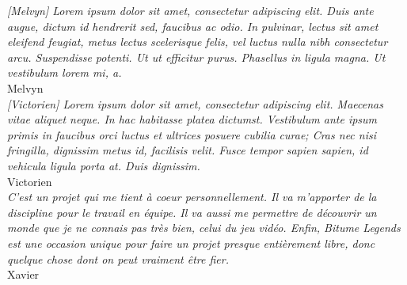 \documentclass[11pt,a4paper]{article}
\begin{document}
  \textit{[Melvyn] Lorem ipsum dolor sit amet, consectetur adipiscing elit. Duis ante augue, dictum id hendrerit sed, faucibus ac odio. In pulvinar, lectus sit amet eleifend feugiat, metus lectus scelerisque felis, vel luctus nulla nibh consectetur arcu. Suspendisse potenti. Ut ut efficitur purus. Phasellus in ligula magna. Ut vestibulum lorem mi, a.}\\
  \indent Melvyn\\

  \textit{[Victorien] Lorem ipsum dolor sit amet, consectetur adipiscing elit. Maecenas vitae aliquet neque. In hac habitasse platea dictumst. Vestibulum ante ipsum primis in faucibus orci luctus et ultrices posuere cubilia curae; Cras nec nisi fringilla, dignissim metus id, facilisis velit. Fusce tempor sapien sapien, id vehicula ligula porta at. Duis dignissim.}\\
  \indent Victorien\\

  \textit{C'est un projet qui me tient à coeur personnellement. Il va m'apporter de la discipline pour le travail
    en équipe. Il va aussi me permettre de découvrir un monde que je ne connais pas très bien, celui du jeu vidéo.
    Enfin, Bitume Legends est une occasion unique pour faire un projet presque entièrement libre, donc quelque
    chose dont on peut vraiment être fier.}\\
  \indent Xavier
\clearpage
\end{document}
